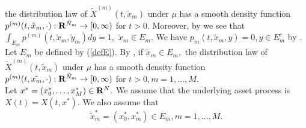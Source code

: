 \documentclass[12pt]{article}
\begin{document}
the distribution law of $\tilde{X}^{(m)}(t,\tilde{x}_m)$ under $\mu$ has a smooth density function
$p^{(m)}(t,\tilde{x}_m,\cdot ):{\bf R}^{\tilde{N}_m}\to [0,\infty )$ for $t>0.$
Moreover, by \cite{KM} we see  that $\int_{E_m} p^{(m)}(t,\tilde{x}_m,\tilde{y}_m)dy =1,$ $\tilde{x}_m\in E_m.$ 
We have $p_m(t,\tilde{x}_m,y)=0, y\in E_m^c$ by \cite{KM}.\\
Let $E_m $ be defined by (\ref{defE}). By \cite{KM}, if $\tilde{x}_m \in E_m,$ 
the distribution law of $\tilde{X}^{(m)}(t,\tilde{x}_m)$ under $\mu$ has a smooth density function
$p^{(m)}(t,\tilde{x_m},\cdot ):{\bf R}^{\tilde{N}_m}\to [0,\infty )$ for $t>0, m=1, \ldots, M.$\\
Let $x^{*} =(x_0^*, \ldots, x_M^*) \in {\bf R}^N.$ We assume that the underlying asset process is $X(t)=X(t, x^*)$.
We also assume that
$$\tilde{x}^*_m=(x_0^*, x_m^*) \in E_m, m=1,\ldots, M.$$
\end{document}

